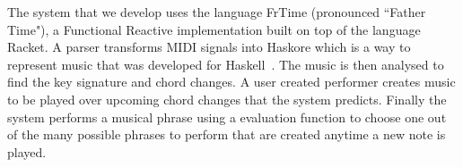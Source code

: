 \documentclass[12pt]{ucthesis}
\begin{document}

The system that we develop uses the language FrTime (pronounced ``Father Time"), a Functional Reactive implementation built on top of the language Racket. A parser transforms MIDI signals into Haskore which is a way to represent music that was developed for Haskell~\cite{haskore}. The music is then analysed to find the key signature and chord changes. A user created performer creates music to be played over upcoming chord changes that the system predicts. Finally the system performs a musical phrase using a evaluation function to choose one out of the many possible phrases to perform that are created anytime a new note is played. 
\end{document}
